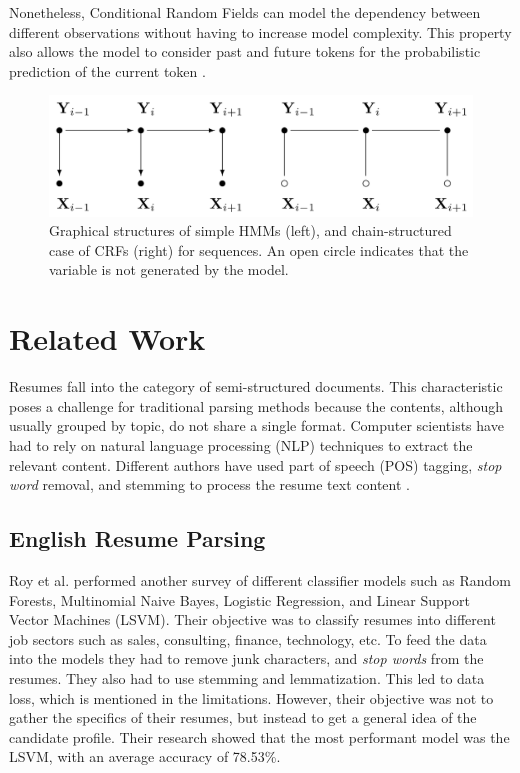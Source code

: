 \documentclass[a4paper, conference]{ieeeconf}
\begin{document}
  Nonetheless, Conditional Random Fields can model the dependency between
  different observations without having to increase model complexity. This
  property also allows the model to consider past and future tokens for the
  probabilistic prediction of the current token \cite{Lafferty2001}.
  \begin{figure}[ht!]
    \centering
    \includegraphics[width=\columnwidth]{hmm_vs_crf.png}
    \caption{%
      Graphical structures of simple HMMs (left), and chain-structured case of
      CRFs (right) for sequences. An open circle indicates that the variable is
      not generated by the model. \cite{Lafferty2001}
    }
  \end{figure}


  \section{Related Work} Resumes fall into the category of semi-structured
  documents. This characteristic poses a challenge for traditional parsing
  methods because the contents, although usually grouped by topic, do not share
  a single format. Computer scientists have had to rely on natural language
  processing (NLP) techniques to extract the relevant content. Different
  authors have used part of speech (POS) tagging, \textit{stop word} removal,
  and stemming to process the resume text content
  \cite{Sanyal2015,Ayishathahira2018a,Roy2020a}.

  \subsection{English Resume Parsing}
  Roy et al. \cite{Roy2020a} performed another survey of different classifier
  models such as Random Forests, Multinomial Naive Bayes, Logistic Regression,
  and Linear Support Vector Machines (LSVM). Their objective was to classify
  resumes into different job sectors such as sales, consulting, finance,
  technology, etc. To feed the data into the models they had to remove junk
  characters, and \textit{stop words} from the resumes. They also had to use
  stemming and lemmatization. This led to data loss, which is mentioned in the
  limitations. However, their objective was not to gather the specifics of
  their resumes, but instead to get a general idea of the candidate profile.
  Their research showed that the most performant model was the LSVM, with an
  average accuracy of 78.53\%.
\end{document}

